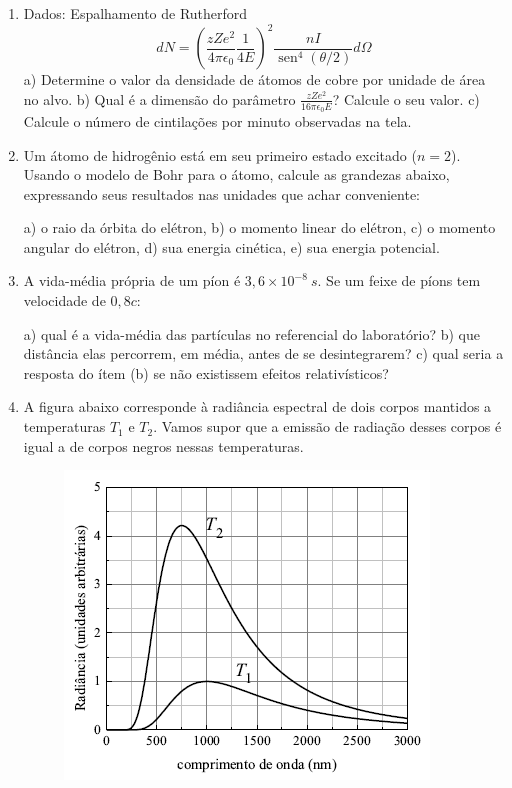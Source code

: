 \begin{enumerate}[start=1,label={\bfseries Q\arabic*.}]
\item[] Dados: Espalhamento de Rutherford $$  dN = \left(  \frac{zZe^{2}}{4 \pi \epsilon_{0}} \frac{1}{4 E}  \right)^{2}  \frac{n I}{\operatorname{sen}^{4}(\theta/2) } d \Omega $$
  a) Determine o valor da densidade de átomos de cobre por unidade de área no alvo.
  b) Qual é a dimensão do parâmetro  $\frac{zZe^{2}}{16 \pi \epsilon_{0} E}$? Calcule o seu valor.
  c) Calcule o número de cintilações por minuto observadas na tela.




\item Um átomo de hidrogênio está em seu primeiro estado excitado ($n = 2$). Usando o modelo de Bohr para o átomo, calcule as grandezas abaixo, expressando seus resultados nas unidades que achar conveniente:

a) o raio da órbita do elétron,
b) o momento linear do elétron,
c) o momento angular do elétron,
d) sua energia cinética,
e) sua energia potencial.



\item A vida-média própria de um píon é $3,6 \times 10^{-8} \ s$. Se um feixe de píons tem velocidade de $0,8c$:

a) qual é a vida-média das partículas no referencial do laboratório?
b) que distância elas percorrem, em média, antes de se desintegrarem?
c) qual seria a resposta do ítem (b) se não existissem efeitos relativísticos?



\item A figura abaixo corresponde à radiância espectral de dois corpos mantidos a temperaturas $T_{1}$ e $T_{2}$. Vamos supor que a emissão de radiação desses corpos é igual a de corpos negros nessas temperaturas.
\begin{figure}
  \centering
  \includegraphics[scale=0.8]{moderna-img/radiancia.png}
\end{figure}


\end{enumerate}
